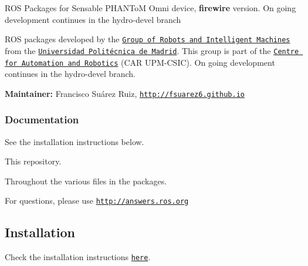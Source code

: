 

R\-O\-S Packages for Sensable P\-H\-A\-N\-To\-M Omni device, {\bfseries firewire} version. On going development continues in the hydro-\/devel branch

R\-O\-S packages developed by the \href{http://www.romin.upm.es/}{\tt Group of Robots and Intelligent Machines} from the \href{http://www.upm.es/internacional}{\tt Universidad Politécnica de Madrid}. This group is part of the \href{http://www.car.upm-csic.es/}{\tt Centre for Automation and Robotics} (C\-A\-R U\-P\-M-\/\-C\-S\-I\-C). On going development continues in the hydro-\/devel branch.

{\bfseries Maintainer\-:} Francisco Suárez Ruiz, \href{http://fsuarez6.github.io}{\tt http\-://fsuarez6.\-github.\-io}

\subsubsection*{Documentation}


\begin{DoxyItemize}
\item See the installation instructions below.
\item This repository.
\item Throughout the various files in the packages.
\item For questions, please use \href{http://answers.ros.org}{\tt http\-://answers.\-ros.\-org}
\end{DoxyItemize}

\subsection*{Installation}

Check the installation instructions \href{http://fsuarez6.github.io/projects/geomagic-touch-in-ros/}{\tt here}. 